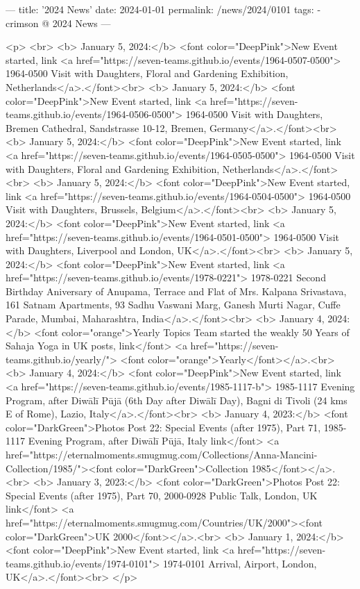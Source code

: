 ---
title: '2024 News'
date: 2024-01-01
permalink: /news/2024/0101
tags:
  - crimson @ 2024 News
---

<p>
<br>
<b> January 5, 2024:</b> <font color="DeepPink">New Event started, link <a href="https://seven-teams.github.io/events/1964-0507-0500"> 1964-0500 Visit with Daughters, Floral and Gardening Exhibition, Netherlands</a>.</font><br>
<b> January 5, 2024:</b> <font color="DeepPink">New Event started, link <a href="https://seven-teams.github.io/events/1964-0506-0500"> 1964-0500 Visit with Daughters, Bremen Cathedral, Sandstrasse 10-12, Bremen, Germany</a>.</font><br>
<b> January 5, 2024:</b> <font color="DeepPink">New Event started, link <a href="https://seven-teams.github.io/events/1964-0505-0500"> 1964-0500 Visit with Daughters, Floral and Gardening Exhibition, Netherlands</a>.</font><br>
<b> January 5, 2024:</b> <font color="DeepPink">New Event started, link <a href="https://seven-teams.github.io/events/1964-0504-0500"> 1964-0500 Visit with Daughters, Brussels, Belgium</a>.</font><br>
<b> January 5, 2024:</b> <font color="DeepPink">New Event started, link <a href="https://seven-teams.github.io/events/1964-0501-0500"> 1964-0500 Visit with Daughters, Liverpool and London, UK</a>.</font><br>
<b> January 5, 2024:</b> <font color="DeepPink">New Event started, link <a href="https://seven-teams.github.io/events/1978-0221"> 1978-0221 Second Birthday Aniversary of Anupama, Terrace and Flat of Mrs. Kalpana Srivastava, 161 Satnam Apartments, 93 Sadhu Vaswani Marg, Ganesh Murti Nagar, Cuffe Parade, Mumbai, Maharashtra, India</a>.</font><br>
<b> January 4, 2024:</b> <font color="orange">Yearly Topics Team started the weakly 50 Years of Sahaja Yoga in UK posts, link</font> <a href="https://seven-teams.github.io/yearly/"> <font color="orange">Yearly</font></a>.<br>
<b> January 4, 2024:</b> <font color="DeepPink">New Event started, link <a href="https://seven-teams.github.io/events/1985-1117-b"> 1985-1117 Evening Program, after Diwālī Pūjā (6th Day after Diwālī Day), Bagni di Tivoli (24 kms E of Rome), Lazio, Italy</a>.</font><br>
<b> January 4, 2023:</b> <font color="DarkGreen">Photos Post 22: Special Events (after 1975), Part 71, 1985-1117 Evening Program, after Diwālī Pūjā, Italy link</font> <a href="https://eternalmoments.smugmug.com/Collections/Anna-Mancini-Collection/1985/"><font color="DarkGreen">Collection 1985</font></a>.<br>
<b> January 3, 2023:</b> <font color="DarkGreen">Photos Post 22: Special Events (after 1975), Part 70, 2000-0928 Public Talk, London, UK link</font> <a href="https://eternalmoments.smugmug.com/Countries/UK/2000"><font color="DarkGreen">UK 2000</font></a>.<br>
<b> January 1, 2024:</b> <font color="DeepPink">New Event started, link <a href="https://seven-teams.github.io/events/1974-0101"> 1974-0101 Arrival, Airport, London, UK</a>.</font><br>
</p>